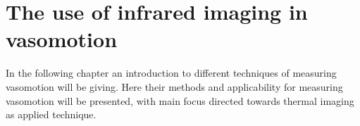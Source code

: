 \chapter{The use of infrared imaging in vasomotion}

In the following chapter an introduction to different techniques of measuring vasomotion will be giving. Here their methods and applicability for measuring vasomotion will be presented, with main focus directed towards thermal imaging as applied technique. 